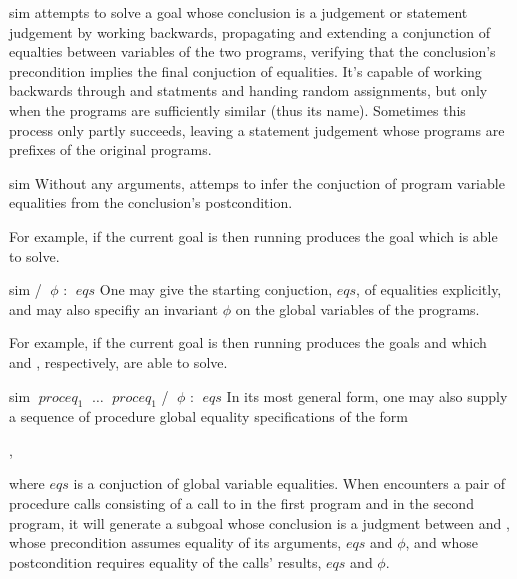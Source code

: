 \begin{tactic}{sim}
   attempts to solve a goal whose conclusion is a \prhl
  judgement or statement judgement by working backwards, propagating
  and extending a conjunction of equalties between variables of the
  two programs, verifying that the conclusion's precondition implies
  the final conjuction of equalities.  It's capable of working
  backwards through  and  statments and handing
  random assignments, but only when the programs are sufficiently
  similar (thus its name). Sometimes this process only partly
  succeeds, leaving a statement judgement whose programs are prefixes
  of the original programs.

  \begin{tsyntax}{sim}
    Without any arguments,  attemps to infer the conjuction of
    program variable equalities from the conclusion's postcondition.

    \medskip For example, if the current goal is
     then
    running 
    produces the goal
    which  is able to solve.
  \end{tsyntax}

  \begin{tsyntax}{sim / $\;\phi$ : $\;\mathit{eqs}$}
    One may give the starting conjuction, $\mathit{eqs}$, of equalities
    explicitly, and may also specifiy an invariant $\phi$ on the
    global variables of the programs.

    \medskip For example, if the current goal is
     then
    running 
    produces the goals
    and
    which  and , respectively, are
    able to solve.
  \end{tsyntax}

  \begin{tsyntax}{sim $\;\mathit{proceq}_1$ $\;\ldots$ $\;\mathit{proceq}_1$ / $\;\phi$ : $\;\mathit{eqs}$}
    In its most general form, one may also supply a sequence of
    procedure global equality specifications of the form
    \begin{center}
      ,
    \end{center}
    where $\mathit{eqs}$ is a conjuction of global variable
    equalities. When  encounters a pair of procedure calls
    consisting of a call to  in the first program and
     in the second program, it will generate a subgoal
    whose conclusion is a \prhl judgment between  and
    , whose precondition assumes equality of its
    arguments, $\mathit{eqs}$ and $\phi$, and whose postcondition
    requires equality of the calls' results, $\mathit{eqs}$ and
    $\phi$.


\end{tsyntax}
\end{tactic}
